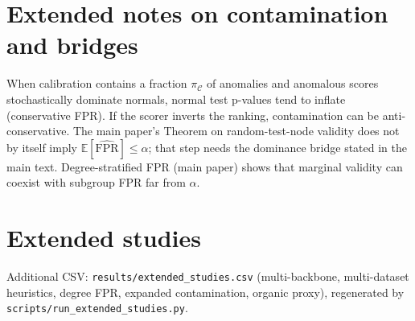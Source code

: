 \documentclass[a4paper,11pt]{article}
\begin{document}
\section{Extended notes on contamination and bridges}
\label{sec:supp_contamination}
When calibration contains a fraction $\pi_{\mathcal{C}}$ of anomalies and anomalous scores stochastically dominate normals, normal test p-values tend to inflate (conservative FPR).
If the scorer inverts the ranking, contamination can be anti-conservative.
The main paper's Theorem on random-test-node validity does not by itself imply $\mathbb{E}[\widehat{\mathrm{FPR}}]\leq\alpha$; that step needs the dominance bridge stated in the main text.
Degree-stratified FPR (main paper) shows that marginal validity can coexist with subgroup FPR far from $\alpha$.

\section{Extended studies}
Additional CSV: \texttt{results/extended\_studies.csv} (multi-backbone, multi-dataset heuristics, degree FPR, expanded contamination, organic proxy), regenerated by \texttt{scripts/run\_extended\_studies.py}.
\end{document}
